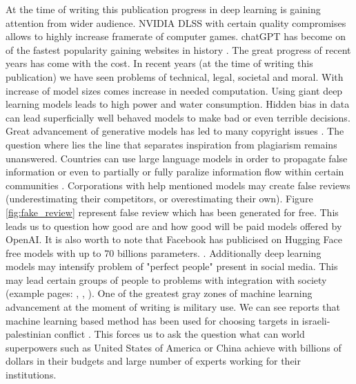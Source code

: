 \documentclass[10pt]{article}
\begin{document}
At the time of writing this publication progress in deep learning is gaining attention from wider audience. NVIDIA DLSS  with certain quality compromises allows to highly increase framerate of computer games. chatGPT has become on of the fastest popularity gaining websites in history \cite{gpt_popularity}. The great progress of recent years has come with the cost. In recent years (at the time of writing this publication) we have seen problems of technical, legal, societal and moral. With increase of model sizes comes increase in needed computation. Using giant deep learning models leads to high power and water consumption. Hidden bias in data can lead superficially well behaved models to make bad or even terrible decisions. Great advancement of generative models has led to many copyright issues \cite{ai_copyright}. The question where lies the line that separates inspiration from plagiarism remains unanswered.
 Countries can use large language models in order to propagate false information or even to partially or fully paralize information flow within certain communities \cite{ai_false_texts}.
Corporations with help mentioned models may create false reviews (underestimating their competitors, or overestimating their own). Figure \ref{fig:fake_review} represent false review which has been generated for free. This leads us to question how good are and how good will be paid models offered by OpenAI. It is also worth to note that Facebook has publicised 
on Hugging Face free models with up to 70 billions parameters. \cite{llama_hug_face}. Additionally deep learning models may intensify problem of "perfect people" present in social media. This may lead certain groups of people to problems with integration with society (example pages: \cite{ai_replika}, \cite{claudia_ai}, \cite{ai_picso}). One of the greatest gray zones of machine learning advancement at the moment of writing is military use. We can see reports that machine learning based method has been used for choosing targets in israeli-palestinian conflict \cite{Conflict}. This forces us to ask the question what can world superpowers such as United States of America or China achieve with billions of dollars in their budgets and large number of experts working for their institutions.
\end{document}
